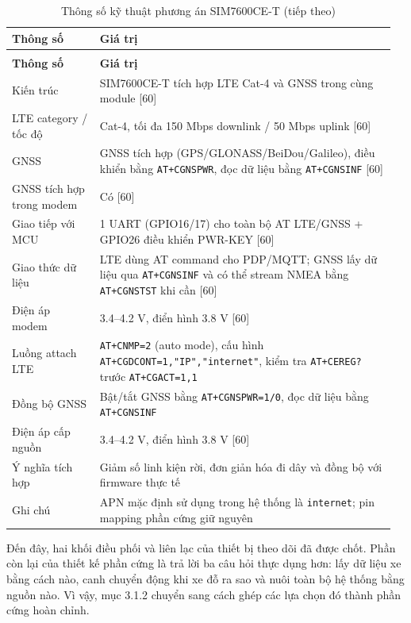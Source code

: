 \documentclass[a4paper]{extarticle}
\newcommand{\thesissettableid}[2]{%
  \renewcommand{\thetable}{#1}%
  \renewcommand{\theHtable}{#2}%
}
\begin{document}
{\thesissettableid{3.4}{tab-ch3-thong-so-ky-thuat-phuong-an-sim7600ce-t}
\def\LTcaptype{table}
\begin{longtable}{|L{0.220\linewidth}|L{0.740\linewidth}|}
\caption{Thông số kỹ thuật phương án SIM7600CE-T}\label{tab:ch3-thong-so-ky-thuat-phuong-an-sim7600ce-t}\\
\hline \textbf{Thông số} & \textbf{Giá trị} \\
\hline
\endfirsthead
\caption[]{Thông số kỹ thuật phương án SIM7600CE-T (tiếp theo)}\\
\hline \textbf{Thông số} & \textbf{Giá trị} \\
\hline
\endhead
\hline
\endfoot
\endlastfoot
Kiến trúc & SIM7600CE-T tích hợp LTE Cat-4 và GNSS trong cùng module
{[}60{]} \\\hline
LTE category / tốc độ & Cat-4, tối đa 150 Mbps downlink / 50 Mbps uplink
{[}60{]} \\\hline
GNSS & GNSS tích hợp (GPS/GLONASS/BeiDou/Galileo), điều khiển bằng
\texttt{AT+CGNSPWR}, đọc dữ liệu bằng \texttt{AT+CGNSINF} {[}60{]} \\\hline
GNSS tích hợp trong modem & Có {[}60{]} \\\hline
Giao tiếp với MCU & 1 UART (GPIO16/17) cho toàn bộ AT LTE/GNSS + GPIO26
điều khiển PWR-KEY {[}60{]} \\\hline
Giao thức dữ liệu & LTE dùng AT command cho PDP/MQTT; GNSS lấy dữ liệu
qua \texttt{AT+CGNSINF} và có thể stream NMEA bằng \texttt{AT+CGNSTST}
khi cần {[}60{]} \\\hline
Điện áp modem & 3.4--4.2 V, điển hình 3.8 V {[}60{]} \\\hline
Luồng attach LTE & \texttt{AT+CNMP=2} (auto mode), cấu hình
\texttt{AT+CGDCONT=1,"IP","internet"}, kiểm tra \texttt{AT+CEREG?} trước
\texttt{AT+CGACT=1,1} \\\hline
Đồng bộ GNSS & Bật/tắt GNSS bằng \texttt{AT+CGNSPWR=1/0}, đọc dữ liệu
bằng \texttt{AT+CGNSINF} \\\hline
Điện áp cấp nguồn & 3.4--4.2 V, điển hình 3.8 V {[}60{]} \\\hline
Ý nghĩa tích hợp & Giảm số linh kiện rời, đơn giản hóa đi dây và đồng bộ
với firmware thực tế \\\hline
Ghi chú & APN mặc định sử dụng trong hệ thống là \texttt{internet}; pin
mapping phần cứng giữ nguyên \\\hline
\end{longtable}
}

Đến đây, hai khối điều phối và liên lạc của thiết bị theo dõi đã được chốt. Phần
còn lại của thiết kế phần cứng là trả lời ba câu hỏi thực dụng hơn: lấy
dữ liệu xe bằng cách nào, canh chuyển động khi xe đỗ ra sao và nuôi
toàn bộ hệ thống bằng nguồn nào. Vì vậy, mục 3.1.2 chuyển sang cách ghép
các lựa chọn đó thành phần cứng hoàn chỉnh.
\end{document}
